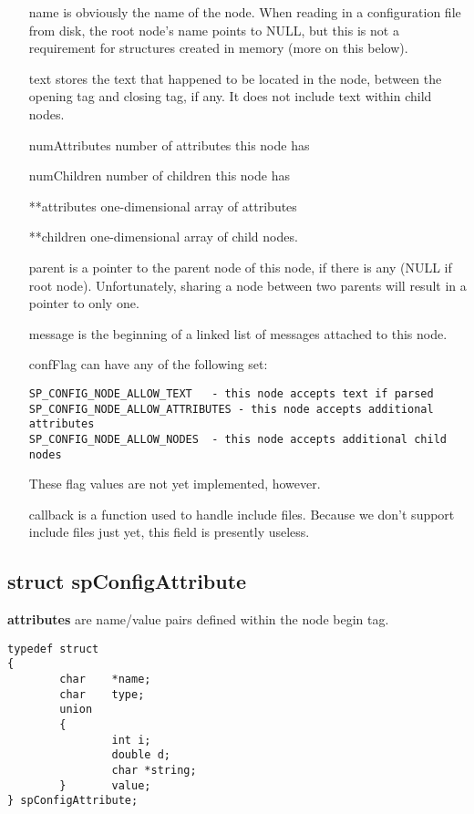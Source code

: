 \documentclass[10pt]{article}
\begin{document}
\begin{itemize}
	\item[name] is obviously the name of the node. When reading in a configuration file from disk, the root node's name points to NULL, but
this is not a requirement for structures created in memory (more on this below).
	\item[text] stores the text that happened to be located in the node, between the opening tag and closing tag, if any.  It does not include text within child nodes.
	\item[numAttributes] number of attributes this node has
	\item[numChildren] number of children this node has
	\item[**attributes] one-dimensional array of attributes
	\item[**children] one-dimensional array of child nodes.
	\item[parent] is a pointer to the parent node of this node, if there is any (NULL if root node). 
Unfortunately, sharing a node between two parents will result in a pointer to only one.
	\item[message] is the beginning of a linked list of messages attached to this node.
	\item[confFlag] can have any of the following set:
\begin{verbatim}
SP_CONFIG_NODE_ALLOW_TEXT   - this node accepts text if parsed
SP_CONFIG_NODE_ALLOW_ATTRIBUTES - this node accepts additional attributes
SP_CONFIG_NODE_ALLOW_NODES  - this node accepts additional child nodes
\end{verbatim}

These flag values are not yet implemented, however.
	\item[callback] is a function used to handle include files.  Because we don't support
include files just yet, this field is presently useless.
\end{itemize}



\subsection{struct spConfigAttribute}

\noindent\textbf{attributes} are name/value pairs defined within the node begin tag.
\begin{verbatim}
typedef struct
{
        char    *name;
        char    type;
        union
        {
                int i;
                double d;
                char *string;
        }       value;
} spConfigAttribute;
\end{verbatim}
\end{document}
